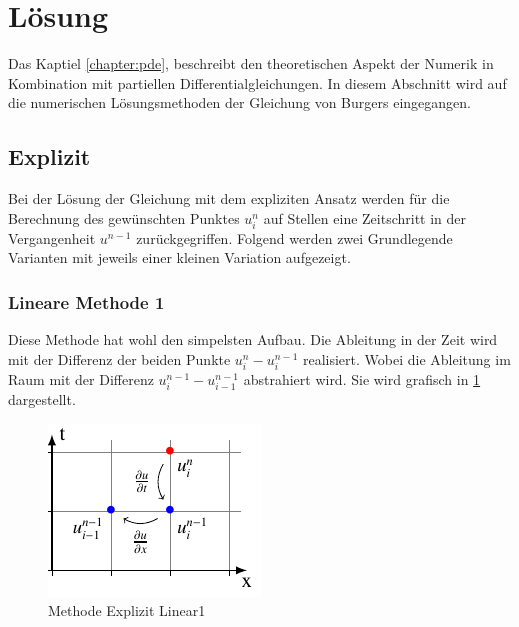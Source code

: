 %
%
\section{Lösung
\label{burgers:section:loesung}}

Das Kaptiel \ref{chapter:pde}, beschreibt den theoretischen Aspekt der Numerik in Kombination mit partiellen Differentialgleichungen.
In diesem Abschnitt wird auf die numerischen Lösungsmethoden der Gleichung von Burgers eingegangen.


\subsection{Explizit}

Bei der Lösung der Gleichung mit dem expliziten Ansatz werden für die Berechnung des gewünschten Punktes $u_i^n$ auf Stellen eine  Zeitschritt in der Vergangenheit $u^{n-1}$ zurückgegriffen.
Folgend werden zwei Grundlegende Varianten mit jeweils einer kleinen Variation aufgezeigt.
 
\subsubsection{Lineare Methode 1}
	
	Diese Methode hat wohl den simpelsten Aufbau.
	Die Ableitung in der Zeit wird mit der Differenz der beiden Punkte $u_{i}^{n}-u_{i}^{n-1}$ realisiert.
	Wobei die Ableitung im Raum mit der Differenz $u_{i}^{n-1}-u_{i-1}^{n-1}$ abstrahiert wird.
	Sie wird grafisch in \ref{burgers:fig:Linear1} dargestellt.

	
	     \begin{figure}[!ht]
		\centering
		\includegraphics[height=.4\textwidth]{papers/burgers/BurgersEquation/tikz/Linear1/Linear1.pdf}
		\caption{Methode Explizit Linear1}
		\label{burgers:fig:Linear1}
		\end{figure}
	
